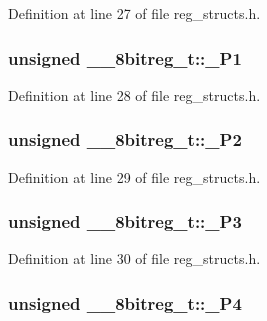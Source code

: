 Definition at line 27 of file reg\-\_\-structs.\-h.

\hypertarget{struct____8bitreg__t_a108c964a03f1123681899156b636e203}{
\subsubsection[{\-\_\-\-P1}]{\setlength{\rightskip}{0pt plus 5cm}unsigned \-\_\-\-\_\-8bitreg\-\_\-t\-::\-\_\-\-P1}}\label{struct____8bitreg__t_a108c964a03f1123681899156b636e203}


Definition at line 28 of file reg\-\_\-structs.\-h.

\hypertarget{struct____8bitreg__t_a30b9937367ef01f1adc9f4353c9c323e}{
\subsubsection[{\-\_\-\-P2}]{\setlength{\rightskip}{0pt plus 5cm}unsigned \-\_\-\-\_\-8bitreg\-\_\-t\-::\-\_\-\-P2}}\label{struct____8bitreg__t_a30b9937367ef01f1adc9f4353c9c323e}


Definition at line 29 of file reg\-\_\-structs.\-h.

\hypertarget{struct____8bitreg__t_a5d21a8af52e9e72f540bc6032d7c1047}{
\subsubsection[{\-\_\-\-P3}]{\setlength{\rightskip}{0pt plus 5cm}unsigned \-\_\-\-\_\-8bitreg\-\_\-t\-::\-\_\-\-P3}}\label{struct____8bitreg__t_a5d21a8af52e9e72f540bc6032d7c1047}


Definition at line 30 of file reg\-\_\-structs.\-h.

\hypertarget{struct____8bitreg__t_a8e1225a088df1088350fd78a57fa38b4}{
\subsubsection[{\-\_\-\-P4}]{\setlength{\rightskip}{0pt plus 5cm}unsigned \-\_\-\-\_\-8bitreg\-\_\-t\-::\-\_\-\-P4}}\label{struct____8bitreg__t_a8e1225a088df1088350fd78a57fa38b4}


